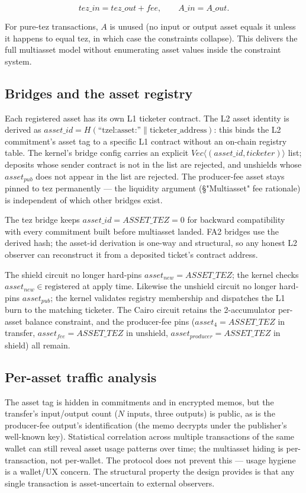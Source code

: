 \documentclass[11pt]{article}
\begin{document}
\[
tez\_in = tez\_out + fee, \qquad A\_in = A\_out.
\]

For pure-tez transactions, \(A\) is unused (no input or output
asset equals it unless it happens to equal tez, in which case the
constraints collapse). This delivers the full multiasset model
without enumerating asset values inside the constraint system.

\subsection{Bridges and the asset registry}

Each registered asset has its own L1 ticketer contract. The L2
asset identity is derived as
\(asset\_id = H(\text{``tzel:asset:''} \parallel \text{ticketer\_address})\):
this binds the L2 commitment's asset tag to a specific L1 contract
without an on-chain registry table. The kernel's bridge config
carries an explicit \(Vec\langle (asset\_id, ticketer) \rangle\) list;
deposits whose sender contract is not in the list are rejected, and
unshields whose \(asset_{pub}\) does not appear in the list are
rejected. The producer-fee asset stays pinned to tez permanently —
the liquidity argument (§"Multiasset" fee rationale) is independent
of which other bridges exist.

The tez bridge keeps \(asset\_id = ASSET\_TEZ = 0\) for backward
compatibility with every commitment built before multiasset landed.
FA2 bridges use the derived hash; the asset-id derivation is one-way
and structural, so any honest L2 observer can reconstruct it from a
deposited ticket's contract address.

The shield circuit no longer hard-pins \(asset_{new} = ASSET\_TEZ\);
the kernel checks \(asset_{new} \in \text{registered}\) at apply time.
Likewise the unshield circuit no longer hard-pins \(asset_{pub}\);
the kernel validates registry membership and dispatches the L1 burn
to the matching ticketer. The Cairo circuit retains the
2-accumulator per-asset balance constraint, and the producer-fee
pins (\(asset_{4} = ASSET\_TEZ\) in transfer, \(asset_{fee} =
ASSET\_TEZ\) in unshield, \(asset_{producer} = ASSET\_TEZ\) in
shield) all remain.

\subsection{Per-asset traffic analysis}

The asset tag is hidden in commitments and in encrypted memos, but
the transfer's input/output count (\(N\) inputs, three outputs) is
public, as is the producer-fee output's identification (the memo
decrypts under the publisher's well-known key). Statistical
correlation across multiple transactions of the same wallet can
still reveal asset usage patterns over time; the multiasset hiding
is per-transaction, not per-wallet. The protocol does not prevent
this — usage hygiene is a wallet/UX concern. The structural
property the design provides is that any single transaction is
asset-uncertain to external observers.
\end{document}
